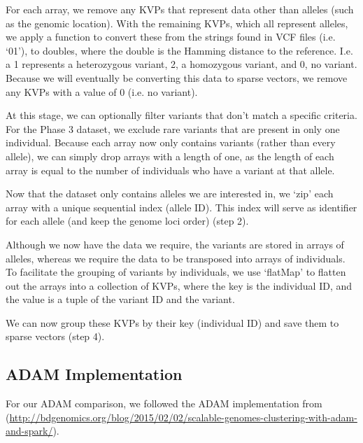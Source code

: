 \documentclass{bmcart}
\begin{document}
For each array, we remove any KVPs that represent data other than alleles (such as the genomic location). With the remaining KVPs, which all
represent alleles, we apply a function to convert these from the strings found in VCF files (i.e. `0\textbar{}1'), to doubles, where the double is the
Hamming distance to the reference. I.e. a 1 represents a heterozygous variant, 2, a homozygous variant, and 0, no variant. Because we will
eventually be converting this data to sparse vectors, we remove any KVPs with a value of 0 (i.e. no variant).

At this stage, we can optionally filter variants that don't match a specific criteria. For the Phase 3 dataset, we exclude rare variants that are present in
only one individual. Because each array now only contains variants (rather than every allele), we can simply drop arrays with a length of one, as the length
of each array is equal to the number of individuals who have a variant at that allele.

Now that the dataset only contains alleles we are interested in, we `zip' each array with a unique sequential index (allele ID). This index will serve
as identifier for each allele (and keep the genome loci order) (step 2).

Although we now have the data we require, the variants are stored in arrays of alleles, whereas we require the data to be transposed into arrays of individuals.
To facilitate the grouping of variants by individuals, we use `flatMap' to flatten out the arrays into a collection of KVPs, where the key is the individual ID, and the
value is a tuple of the variant ID and the variant.

We can now group these KVPs by their key (individual ID) and save them to sparse vectors (step 4).


\subsection*{{\sc ADAM} Implementation}
For our {\sc ADAM} comparison, we followed the {\sc ADAM} implementation from (\url{http://bdgenomics.org/blog/2015/02/02/scalable-genomes-clustering-with-adam-and-spark/}).
\end{document}
